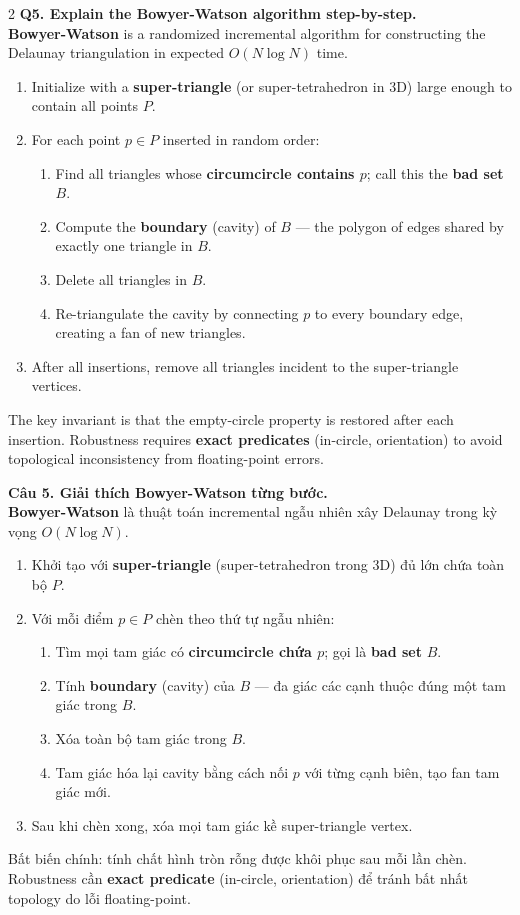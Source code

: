 \begin{paracol}{2}
\textbf{Q5. Explain the Bowyer-Watson algorithm step-by-step.}\\
\textbf{Bowyer-Watson} is a randomized incremental algorithm for constructing the Delaunay triangulation in expected $O(N \log N)$ time.
\begin{enumerate}[leftmargin=*,nosep]
\item Initialize with a \textbf{super-triangle} (or super-tetrahedron in 3D) large enough to contain all points $P$.
\item For each point $p \in P$ inserted in random order:
\begin{enumerate}[leftmargin=*,nosep]
\item Find all triangles whose \textbf{circumcircle contains $p$}; call this the \textbf{bad set} $B$.
\item Compute the \textbf{boundary} (cavity) of $B$ — the polygon of edges shared by exactly one triangle in $B$.
\item Delete all triangles in $B$.
\item Re-triangulate the cavity by connecting $p$ to every boundary edge, creating a fan of new triangles.
\end{enumerate}
\item After all insertions, remove all triangles incident to the super-triangle vertices.
\end{enumerate}
The key invariant is that the empty-circle property is restored after each insertion. Robustness requires \textbf{exact predicates} (in-circle, orientation) to avoid topological inconsistency from floating-point errors.

\switchcolumn

\textbf{Câu 5. Giải thích Bowyer-Watson từng bước.}\\
\textbf{Bowyer-Watson} là thuật toán incremental ngẫu nhiên xây Delaunay trong kỳ vọng $O(N \log N)$.
\begin{enumerate}[leftmargin=*,nosep]
\item Khởi tạo với \textbf{super-triangle} (super-tetrahedron trong 3D) đủ lớn chứa toàn bộ $P$.
\item Với mỗi điểm $p \in P$ chèn theo thứ tự ngẫu nhiên:
\begin{enumerate}[leftmargin=*,nosep]
\item Tìm mọi tam giác có \textbf{circumcircle chứa $p$}; gọi là \textbf{bad set} $B$.
\item Tính \textbf{boundary} (cavity) của $B$ — đa giác các cạnh thuộc đúng một tam giác trong $B$.
\item Xóa toàn bộ tam giác trong $B$.
\item Tam giác hóa lại cavity bằng cách nối $p$ với từng cạnh biên, tạo fan tam giác mới.
\end{enumerate}
\item Sau khi chèn xong, xóa mọi tam giác kề super-triangle vertex.
\end{enumerate}
Bất biến chính: tính chất hình tròn rỗng được khôi phục sau mỗi lần chèn. Robustness cần \textbf{exact predicate} (in-circle, orientation) để tránh bất nhất topology do lỗi floating-point.


\end{paracol}
